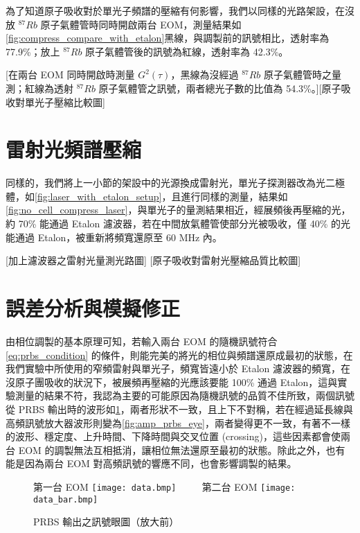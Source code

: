 \documentclass[class=NCU_thesis, crop=false]{standalone}
\begin{document}
為了知道原子吸收對於單光子頻譜的壓縮有何影響，我們以同樣的光路架設，在沒放 $^{87}Rb$ 原子氣體管時同時開啟兩台 EOM，測量結果如\cref{fig:compress_compare_with_etalon}黑線，與調製前的訊號相比，透射率為 77.9\%；放上 $^{87}Rb$ 原子氣體管後的訊號為紅線，透射率為 42.3\%。

[在兩台 EOM 同時開啟時測量 $G^{2}(\tau)$，黑線為沒經過 $^{87}Rb$ 原子氣體管時之量測；紅線為透射 $^{87}Rb$ 原子氣體管之訊號，兩者總光子數的比值為 54.3\%。][原子吸收對單光子壓縮比較圖]

\section{雷射光頻譜壓縮}

同樣的，我們將上一小節的架設中的光源換成雷射光，單光子探測器改為光二極體，如\cref{fig:laser_with_etalon_setup}，且進行同樣的測量，結果如\cref{fig:no_cell_compress_laser}，與單光子的量測結果相近，經展頻後再壓縮的光，約 70\% 能通過 Etalon 濾波器，若在中間放氣體管使部分光被吸收，僅 40\% 的光能通過 Etalon，被重新將頻寬還原至 60 MHz 內。

[加上濾波器之雷射光量測光路圖]
[原子吸收對雷射光壓縮品質比較圖]

\section{誤差分析與模擬修正}

由相位調製的基本原理可知，若輸入兩台 EOM 的隨機訊號符合\cref{eq:prbs_condition} 的條件，則能完美的將光的相位與頻譜還原成最初的狀態，在我們實驗中所使用的窄頻雷射與單光子，頻寬皆遠小於 Etalon 濾波器的頻寬，在沒原子團吸收的狀況下，被展頻再壓縮的光應該要能 100\% 通過 Etalon，這與實驗測量的結果不符，我認為主要的可能原因為隨機訊號的品質不佳所致，兩個訊號從 PRBS 輸出時的波形如\cref{fig:prbs_eye_}，兩者形狀不一致，且上下不對稱，若在經過延長線與高頻訊號放大器波形則變為\cref{fig:amp_prbs_eye}，兩者變得更不一致，有著不一樣的波形、穩定度、上升時間、下降時間與交叉位置 (crossing)，這些因素都會使兩台 EOM 的調製無法互相抵消，讓相位無法還原至最初的狀態。除此之外，也有能是因為兩台 EOM 對高頻訊號的響應不同，也會影響調製的結果。

\begin{figure}[!hbt]
    \centering
    \subcaptionbox
        {第一台 EOM
        \label{fig:subfig_fig1}}
        {\texttt{[image: data.bmp]}}
    ~~~~
    \subcaptionbox
        {第二台 EOM
        \label{fig:subfig_fig2}}
        {\texttt{[image: data\_bar.bmp]}}
    \caption{PRBS 輸出之訊號眼圖（放大前）}
    \label{fig:prbs_eye_}
\end{figure}
\end{document}
